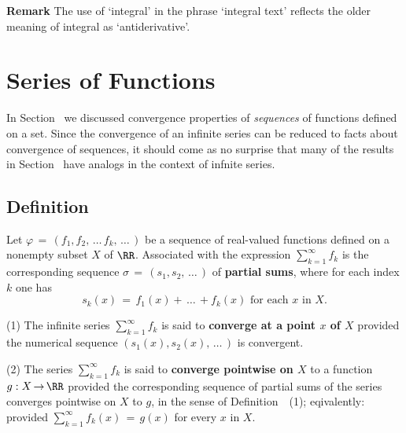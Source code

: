 \V
\V

        {\bf Remark} The use of `integral' in the phrase `integral text' reflects the older meaning of integral as `antiderivative'.




                \section{{\bf Series of Functions}}
                \label{SectG60}

        In Section~ we discussed convergence properties of {\em sequences} of functions defined on a set.
    Since the convergence of an infinite series can be reduced to facts about convergence of sequences,
    it should come as no surprise that many of the results in Section~ have analogs in the context of infnite series.

\V

        \subsection{\small{{\bf Definition}}}
        \label{DefG60.20}
 
\V

        Let ${\varphi} \,=\, (f_{1},f_{2},\,{\ldots}\,f_{k},\,{\ldots}\,)$ be a sequence of real-valued functions defined on a nonempty subset $X$ of ${\RR}$.
   Associated with the expression $\sum_{k=1}^{{\infty}} f_{k}$ is the corresponding sequence ${\sigma} \,=\, (s_{1},s_{2},\,{\ldots}\,)$ of {\bf partial sums},
    where for each index $k$ one has
        \begin{displaymath}
        s_{k}(x) \,=\, f_{1}(x) + \,{\ldots}\,+ f_{k}(x) \mbox{ for each $x$ in $X$}.
        \end{displaymath}

        (1) The infinite series $\sum_{k=1}^{{\infty}} f_{k}$ is said to {\bf converge at a point $x$ of $X$} provided the numerical sequence $(s_{1}(x),s_{2}(x),\,{\ldots}\,)$ is convergent.

\V

        (2) The series $\sum_{k=1}^{{\infty}} f_{k}$ is said to {\bf converge pointwise on $X$} to a function $g:X \,{\rightarrow}\, {\RR}$
    provided the corresponding sequence of partial sums of the series converges pointwise on $X$ to $g$, in the sense of Definition~~(1);
    eqivalently: provided $\sum_{k=1}^{{\infty}} f_{k}(x) \,=\, g(x)$ for every $x$ in $X$.

